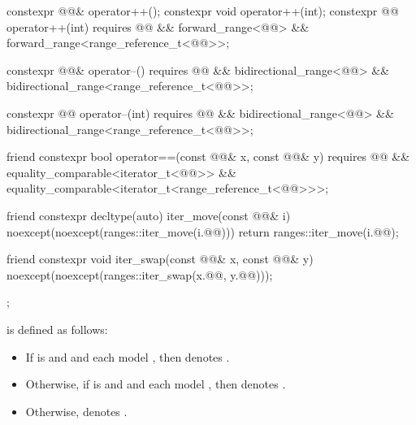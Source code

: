 \begin{codeblock}
{{    constexpr @@& operator++();
    constexpr void operator++(int);
    constexpr @@ operator++(int)
      requires @@ && forward_range<@@> &&
               forward_range<range_reference_t<@@>>;

    constexpr @@& operator--()
      requires @@ && bidirectional_range<@@> &&
               bidirectional_range<range_reference_t<@@>>;

    constexpr @@ operator--(int)
      requires @@ && bidirectional_range<@@> &&
               bidirectional_range<range_reference_t<@@>>;

    friend constexpr bool operator==(const @@& x, const @@& y)
      requires @@ && equality_comparable<iterator_t<@@>> &&
               equality_comparable<iterator_t<range_reference_t<@@>>>;

    friend constexpr decltype(auto) iter_move(const @@& i)
    noexcept(noexcept(ranges::iter_move(i.@@))) {
      return ranges::iter_move(i.@@);
    }

    friend constexpr void iter_swap(const @@& x, const @@& y)
      noexcept(noexcept(ranges::iter_swap(x.@@, y.@@)));
  };
}
\end{codeblock}

\pnum
{} is defined as follows:
\begin{itemize}
\item If  is  and
   and  each model
  , then  denotes
  .
\item Otherwise, if  is  and
   and 
  each model , then  denotes
  .
\item Otherwise,  denotes .
\end{itemize}


